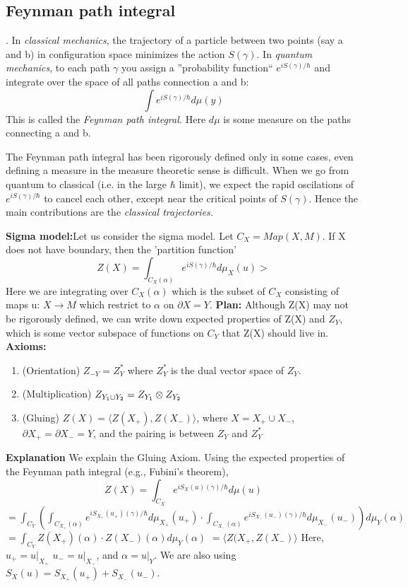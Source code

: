 \subsection{Feynman path integral}.
In \textit{classical mechanics}, the trajectory of a particle between two points (say a and b) in configuration space 
minimizes the action $S(\gamma)$.
 In \textit{quantum mechanics}, to each path $\gamma$ you assign a ''probability function`` $e^{iS(\gamma)/\hbar}$
 and integrate over the space of all paths connection a and b:
 \begin{equation*}
  \int e^{iS(\gamma)/\hbar}d \mu (y)
 \end{equation*}
This is called the \textit{Feynman path integral.} Here $d\mu$ is some measure on the paths connecting a and b. 
\begin{remark}
 The Feynman path integral has been rigorously defined only in some cases, even defining a measure in the measure theoretic sense
 is difficult. 
 When we go from quantum to classical (i.e. in the large $\hbar$ limit), we expect the rapid oscilations of $e^{iS(\gamma)/\hbar}$
 to cancel each other, except near the critical points of $S(\gamma).$ Hence the main contributions are the \textit{classical 
 trajectories.}
\end{remark}
\textbf{Sigma model:}Let us consider the sigma model. Let $C_X= Map(X,M)$. If X does not have boundary, then the 'partition function'
\begin{equation*}
 Z(X) = \int_{C_{X}(\alpha)} e^{iS(\gamma)/\hbar} d \mu_{X} (u)>
\end{equation*}
Here we are integrating over $C_X(\alpha)$ which is the subset of $C_X$ consisting of maps u: $X \rightarrow M$
which restrict to $\alpha$ on $\partial X = Y$.
\textbf{Plan:}
Although Z(X) may not be rigorously defined, we can write down expected properties of Z(X) and $Z_Y$, which is some vector
subspace of functions on $C_Y$ that Z(X) should live in.
\textbf{Axioms:}
\begin{enumerate}
 \item (Orientation) $Z_{-Y} = Z^{*}_Y$ where $Z^{*}_Y$ is the dual vector space of $Z_Y$.
 \item (Multiplication) $Z_{Y_{1} \sqcup Y_{2}} = Z_{Y_{1}} \otimes Z_{Y_{2}}$
 \item (Gluing) $Z(X) = \langle Z(X_{+}), Z(X_{-}) \rangle$, where $X = X_+ \cup X_-$, $\partial X_+ = \partial X_- = Y$,
 and the pairing is between $Z_Y$ and $Z_Y^{*}$
 
 
\end{enumerate}
\textbf{Explanation} We explain the Gluing Axiom. Using the expected properties of the Feynman path integral (e.g., Fubini's
theorem),
\begin{equation*}
 Z(X) = \int_{C_{X}} e^{iS_{X}(u)(\gamma)/\hbar}d \mu (u)
\end{equation*}
$= \int_{C_{Y}} \left(\int_{C_{X_{+}}(\alpha)}e^{iS_{X_{+}}(u_{+})(\gamma)/\hbar}d \mu_{X_{+}} (u_{+}) \cdot 
\int_{C_{X_{-}}(\alpha)}e^{iS_{X_{-}}(u_{-})(\gamma)/\hbar}d \mu_{X_{-}} (u_{-}) \right)d\mu_{Y} (\alpha)$
$= \int_{C_{Y}} Z(X_{+})(\alpha)\cdot Z(X_{-})(\alpha)d\mu_{Y}(\alpha)$
$= \langle Z(X_{+},Z(X_{-})\rangle$
 Here, $u_{+} = u|_{X_{+}}$ $u_{-} = u|_{X_{-}}$, and $\alpha = u|_{Y}.$
 We are also using $S_{X}(u) = S_{X_{+}}(u_{+}) + S_{X_{-}}(u_{-})$.

